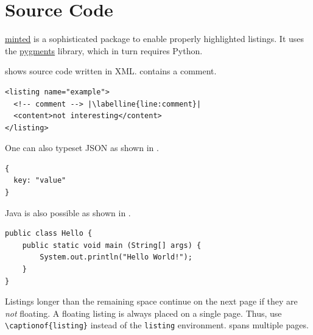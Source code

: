 \section{Source Code}

\href{https://github.com/gpoore/minted}{minted} is a sophisticated package to enable properly highlighted listings.
It uses the \href{http://pygments.org/}{pygments} library, which in turn requires Python.

\begin{ltgexample}
 shows source code written in XML.
 contains a comment.

\begin{listing}[htbp]
  \begin{verbatim}
<listing name="example">
  <!-- comment --> |\labelline{line:comment}|
  <content>not interesting</content>
</listing>
\end{verbatim}
  \caption{Example XML listing using minted}
  \label{lst:XML}
\end{listing}
\end{ltgexample}

One can also typeset JSON as shown in .

\begin{ltgexample}
\begin{listing}[htbp]
  \begin{verbatim}
{
  key: "value"
}
\end{verbatim}
  \caption{Example JSON listing using minted}
  \label{lst:flJSON}
\end{listing}
\end{ltgexample}

Java is also possible as shown in .

\begin{ltgexample}
\begin{listing}[htbp]
  \begin{verbatim}
public class Hello {
    public static void main (String[] args) {
        System.out.println("Hello World!");
    }
}
\end{verbatim}
  \caption{Java code rendered using minted}
  \label{lst:flJava}
\end{listing}
\end{ltgexample}

Listings longer than the remaining space continue on the next page if they are \emph{not} floating.
A floating listing is always placed on a single page.
Thus, use \verb+\captionof{listing}+ instead of the \verb+listing+ environment.
 spans multiple pages.

